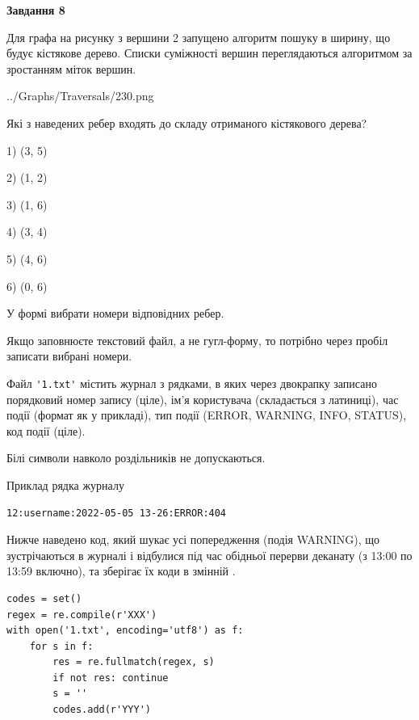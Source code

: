 \documentclass[12pt, ukrainian]{article}
\def\code#1{\Verb!#1!}
\begin{document}
{\begin {large}
{\begin {center}\textbf{Завдання 8}\end {center}}\par
Для графа на рисунку з вершини 2 запущено алгоритм пошуку в ширину, що будує кістякове дерево. Списки суміжності вершин переглядаються алгоритмом за зростанням міток вершин.\par
\begin{center}
	{../Graphs/Traversals/230.png}
\end{center}
\par Які з наведених ребер входять до складу отриманого кістякового дерева?\par
1) (3, 5)\par
2) (1, 2)\par
3) (1, 6)\par
4) (3, 4)\par
5) (4, 6)\par
6) (0, 6)\par
{\vskip 15pt} У формі вибрати номери відповідних ребер.


Якщо заповнюєте текстовий файл, а не гугл-форму, то потрібно через пробіл записа\-ти вибрані номери.\par
\newpage


Файл \code{'1.txt'} містить журнал з рядками, в яких через двокрапку записано поряд\-ко\-вий номер запису (ціле), ім'я користувача (складається з латиниці), час події (фор\-мат як у прикладі), тип події (ERROR, WARNING, INFO, STATUS), код події (ціле).

Білі символи навколо роздільників не допускаються.

Приклад рядка журналу



\begin{verbatim}
12:username:2022-05-05 13-26:ERROR:404
\end{verbatim}


Нижче наведено код, який шукає усі попередження (подія WARNING), що зустрі\-ча\-ються в журналі і відбулися під час обідньої перерви деканату (з 13:00 по 13:59 включно), та зберігає їх коди в змінній .



\begin{verbatim}
codes = set()
regex = re.compile(r'XXX')
with open('1.txt', encoding='utf8') as f:
    for s in f:
        res = re.fullmatch(regex, s)
        if not res: continue
        s = ''
        codes.add(r'YYY')
\end{verbatim}





\end{large}}
\end{document}
